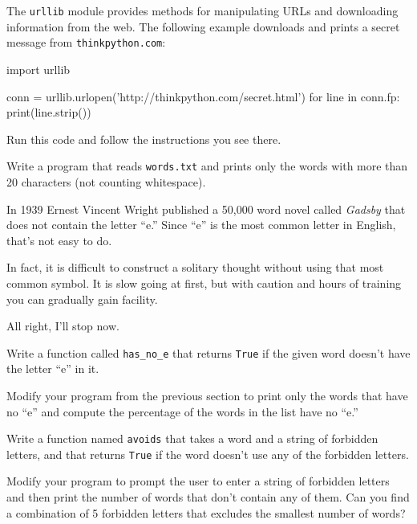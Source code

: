 \begin{exercise}
\label{urllib}


The {\tt urllib} module provides methods for manipulating URLs
and downloading information from the web.  The following example
downloads and prints a secret message from {\tt thinkpython.com}:

\beforeverb
\begin{pyexo}
import urllib

conn = urllib.urlopen('http://thinkpython.com/secret.html')
for line in conn.fp:
    print(line.strip())
\end{pyexo}
\afterverb

Run this code and follow the instructions you see there.


\end{exercise}

\begin{exercise}
\label{ex:words-file}
Write a program that reads {\tt words.txt} and prints only the
words with more than 20 characters (not counting whitespace).


\end{exercise}

\begin{exercise}
\label{ex:gadsby}
In 1939 Ernest Vincent Wright published a 50,000 word novel called
{\em Gadsby} that does not contain the letter ``e.''  Since ``e'' is
the most common letter in English, that's not easy to do.

In fact, it is difficult to construct a solitary thought without using
that most common symbol.  It is slow going at first, but with caution
and hours of training you can gradually gain facility.

All right, I'll stop now.

Write a function called \verb"has_no_e" that returns {\tt True} if
the given word doesn't have the letter ``e'' in it.

Modify your program from the previous section to print only the words
that have no ``e'' and compute the percentage of the words in the list
have no ``e.''


\end{exercise}


\begin{exercise} 
\label{ex:avoids}
Write a function named {\tt avoids}
that takes a word and a string of forbidden letters, and
that returns {\tt True} if the word doesn't use any of the forbidden
letters.

Modify your program to prompt the user to enter a string
of forbidden letters and then print the number of words that
don't contain any of them.
Can you find a combination of 5 forbidden letters that
excludes the smallest number of words?
\end{exercise}



